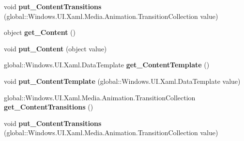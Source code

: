 \begin{DoxyCompactItemize}
\item 
\mbox{\label{interface_windows_1_1_u_i_1_1_xaml_1_1_controls_1_1_i_content_control_a1c0aac2a725d08d1f7e467ea2dd8afd3}} 
void {\bfseries put\+\_\+\+Content\+Transitions} (global\+::\+Windows.\+U\+I.\+Xaml.\+Media.\+Animation.\+Transition\+Collection value)
\item 
\mbox{\label{interface_windows_1_1_u_i_1_1_xaml_1_1_controls_1_1_i_content_control_ab27572e586326eb57ff5e937f9ed7318}} 
object {\bfseries get\+\_\+\+Content} ()
\item 
\mbox{\label{interface_windows_1_1_u_i_1_1_xaml_1_1_controls_1_1_i_content_control_a5350840458a62ceb693e7746c04986f3}} 
void {\bfseries put\+\_\+\+Content} (object value)
\item 
\mbox{\label{interface_windows_1_1_u_i_1_1_xaml_1_1_controls_1_1_i_content_control_aa941dee35deb2872cc78a0e3bbfaa7f6}} 
global\+::\+Windows.\+U\+I.\+Xaml.\+Data\+Template {\bfseries get\+\_\+\+Content\+Template} ()
\item 
\mbox{\label{interface_windows_1_1_u_i_1_1_xaml_1_1_controls_1_1_i_content_control_ab8635fb05ae89dd2ff4d0697e5c78b84}} 
void {\bfseries put\+\_\+\+Content\+Template} (global\+::\+Windows.\+U\+I.\+Xaml.\+Data\+Template value)
\item 
\mbox{\label{interface_windows_1_1_u_i_1_1_xaml_1_1_controls_1_1_i_content_control_aa51222b3d15db7740854e4ddbad68fd3}} 
global\+::\+Windows.\+U\+I.\+Xaml.\+Media.\+Animation.\+Transition\+Collection {\bfseries get\+\_\+\+Content\+Transitions} ()
\item 
\mbox{\label{interface_windows_1_1_u_i_1_1_xaml_1_1_controls_1_1_i_content_control_a1c0aac2a725d08d1f7e467ea2dd8afd3}} 
void {\bfseries put\+\_\+\+Content\+Transitions} (global\+::\+Windows.\+U\+I.\+Xaml.\+Media.\+Animation.\+Transition\+Collection value)

\end{DoxyCompactItemize}
